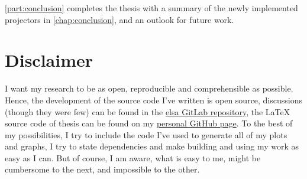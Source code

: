 \autoref{part:conclusion} completes the thesis with a summary of the newly implemented projectors in
\autoref{chap:conclusion}, and an outlook for future work.

\section{Disclaimer}\label{sec:disclaimer}

I want my research to be as open, reproducible and comprehensible as possible. Hence, the
development of the source code I've written is open source, discussions (though they were few) can be
found in the \href{https://gitlab.lrz.de/IP/elsa}{elsa GitLab repository}, the \LaTeX{} source code
of thesis can be found on my
\href{https://github.com/ner0-m/ma-thesis-differential-basis-for-ct}{personal GitHub page}. To the
best of my possibilities, I try to include the code I've used to generate all of my plots and
graphs, I try to state dependencies and make building and using my work as easy as I can. But of
course, I am aware, what is easy to me, might be cumbersome to the next, and impossible to the
other.

